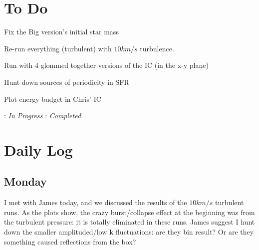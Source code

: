 \documentclass[11pt,letterpaper]{article}
\begin{document}
\section{To Do}
\begin{bullets}
\item[\checkmark] Fix the Big version's initial star mass
\item[\checkmark] Re-run everything (turbulent) with $10km/s$ turbulence.
\item[\textleaf] Run with 4 glommed together versions of the IC (in the x-y plane)
\item Hunt down sources of periodicity in SFR
\item Plot energy budget in Chris' IC
\end{bullets}

\textleaf : \textit{In Progress} \qquad \checkmark : \textit{Completed}
\section{Daily Log}

\subsection{Monday}

I met with James today, and we discussed the results of the $10 km/s$
turbulent runs. As the plots show, the crazy burst/collapse effect at
the beginning was from the turbulent pressure: it is totally eliminated
in these runs. James suggest I hunt down the smaller amplituded/low
$\mathbf{k}$ fluctuations: are they bin result? Or are they something
caused reflections from the box?
\end{document}
